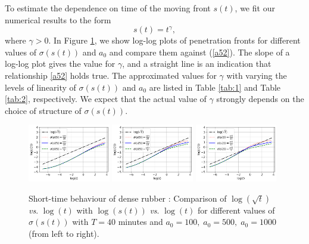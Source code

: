 \documentclass{article}
\begin{document}
To estimate the dependence on time of the moving front $s(t)$, we fit our numerical results to the form 
\begin{equation} \label{a52}
s(t) =  t^{\gamma},\end{equation}
 where $\gamma> 0.$ In Figure \ref{Fig:13}, we show log-log plots of penetration fronts for different values of $\sigma(s(t))$ and $a_0$ and compare them against (\ref{a52}).    The slope of a log-log plot gives the value for $\gamma$, and a straight line is an indication that  relationship \eqref{a52} holds true. %
 The approximated values for $\gamma$ with varying the levels of linearity of $\sigma(s(t))$ and $a_0$ are listed in Table \ref{tab:1} and Table  \ref{tab:2}, respectively. We expect that the actual value of $\gamma$ strongly depends on the choice of structure of $\sigma(s(t))$.
\begin{figure}[h!]
	\centering
	\includegraphics[width=0.32\textwidth]{Rubber_Loglog_a0_100.png}
	\hspace{0.1cm}
	\includegraphics[width=0.32\textwidth]{Rubber_Loglog_a0_500.png}
	\hspace{0.1cm}
	\includegraphics[width=0.32\textwidth]{Rubber_Loglog_a0_1000.png}
	\caption{Short-time behaviour of  dense rubber : Comparison of $\log(\sqrt{t})$ \textit{vs}. $\log(t)$ with  $\log(s(t))$ \textit{vs}. $\log(t)$ for different values of $\sigma(s(t))$ with $T = 40$ minutes and  $a_0 = 100, \;a_0 =  500, \;a_0 =  1000$ (from left to right).}
	\label{Fig:13}
\end{figure}
 
\end{document}
